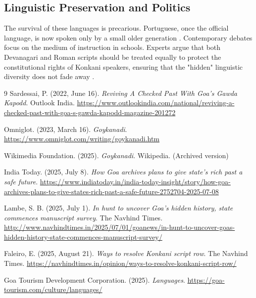 \documentclass[12pt,a4paper]{article}
\begin{document}
\subsection{Linguistic Preservation and Politics}
The survival of these languages is precarious. Portuguese, once the official language, is now spoken only by a small older generation \cite{GoaTourism2025}. Contemporary debates focus on the medium of instruction in schools. Experts argue that both Devanagari and Roman scripts should be treated equally to protect the constitutional rights of Konkani speakers, ensuring that the "hidden" linguistic diversity does not fade away \cite{Faleiro2025}.

\newpage
\begin{thebibliography}{9}
    Sardessai, P. (2022, June 16). \textit{Reviving A Checked Past With Goa’s Gawda Kapodd}. Outlook India. \url{https://www.outlookindia.com/national/reviving-a-checked-past-with-goa-s-gawda-kapodd-magazine-201272}

    Omniglot. (2023, March 16). \textit{Goykanadi}. \url{https://www.omniglot.com/writing/goykanadi.htm}

    Wikimedia Foundation. (2025). \textit{Goykanadi}. Wikipedia. (Archived version)

    India Today. (2025, July 8). \textit{How Goa archives plans to give state's rich past a safe future}. \url{https://www.indiatoday.in/india-today-insight/story/how-goa-archives-plans-to-give-states-rich-past-a-safe-future-2752704-2025-07-08}

    Lambe, S. B. (2025, July 1). \textit{In hunt to uncover Goa’s hidden history, state commences manuscript survey}. The Navhind Times. \url{http://www.navhindtimes.in/2025/07/01/goanews/in-hunt-to-uncover-goas-hidden-history-state-commences-manuscript-survey/}

    Faleiro, E. (2025, August 21). \textit{Ways to resolve Konkani script row}. The Navhind Times. \url{https://navhindtimes.in/opinion/ways-to-resolve-konkani-script-row/}

    Goa Tourism Development Corporation. (2025). \textit{Languages}. \url{https://goa-tourism.com/culture/languages/}

\end{thebibliography}
\end{document}
